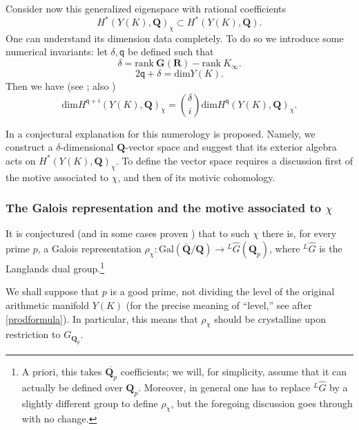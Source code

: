 \documentclass[10pt]{amsart}
\newcommand{\Gal}{\mathrm{Gal}}
\newcommand{\LG}{^{L}\hat{G}}
\renewcommand{\dim}{\mathrm{dim}}
\newcommand{\Q}{\mathbf{Q}}
\newcommand{\R}{\mathbf{R}}
\theoremstyle{remark}
\newcommand{\BWq}{\mathsf{q}}
\begin{document}
%
%
%
%
%
%
%
%
%
%
%

%
%
%
%
%
%
%
%
%
%
%


 
Consider now this generalized eigenspace with rational coefficients $$H^*(Y(K), \Q)_{\chi} \subset H^*(Y(K), \Q).$$
 One can understand its dimension data completely. To do so
we introduce some numerical invariants: let  $\delta, \BWq$ be defined such that
   \begin{equation} \delta  = \mathrm{rank} \  \mathbf{G}(\R) - \mathrm{rank} \ K_{\infty}. \end{equation} 
     \begin{equation} \label{qdef0} 2 \BWq +\delta = \dim Y(K). \end{equation} 
  Then  we have 
 (see \cite[Theorem III.5.1]{BW}; also \cite[Cor. 5.5]{Borel2})
\begin{equation} \label{dimeq} \dim H^{\BWq+i} (Y(K), \Q)_{\chi} = {\delta \choose i} \dim H^{\BWq}(Y(K), \Q)_{\chi}.\end{equation}
 
  In \cite{PV} a conjectural explanation for this numerology is proposed. Namely, 
 we construct a $\delta$-dimensional $\Q$-vector space  and 
 suggest that its exterior algebra acts on $H^*(Y(K), \Q)_{\chi}$. To define the vector space requires
a discussion first of the motive associated to $\chi$, and then of its motivic cohomology. 

\subsubsection{The Galois representation and the motive associated to $\chi$}
It is conjectured (and in some cases proven \cite{Scholze}) 
that to such $\chi$ there is, for every prime $p$,  a Galois representation 
$\rho_{\chi}: \Gal(\overline{\Q}/\Q) \rightarrow {}  \LG(\Q_{p})$, where $\LG$ is the Langlands dual group.\footnote{A priori, this takes  $\overline{\Q_{p}}$
coefficients; we will, for simplicity, assume that it can actually be defined over $\Q_{p}$. Moreover,  in general \cite[\S 3.4]{BG}  one has to
replace $\LG$ by a slightly different group to define $\rho_{\chi}$, but the foregoing discussion goes through with no change. 
 } 
 
 We shall suppose that $p$ is a good prime,  not dividing the level of the original arithmetic manifold $Y(K)$ (for the precise meaning of ``level,''
 see after \eqref{prodformula}). 
In particular, this means that $\rho_{\chi}$ should be crystalline upon restriction to $G_{\Q_p}$. 
 
\end{document}

